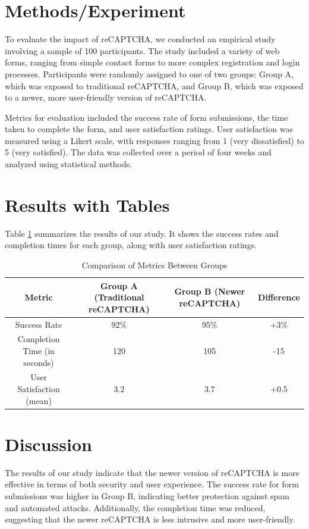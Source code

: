 \documentclass{article}
\begin{document}
\section{Methods/Experiment}
To evaluate the impact of reCAPTCHA, we conducted an empirical study involving a sample of 100 participants. The study included a variety of web forms, ranging from simple contact forms to more complex registration and login processes. Participants were randomly assigned to one of two groups: Group A, which was exposed to traditional reCAPTCHA, and Group B, which was exposed to a newer, more user-friendly version of reCAPTCHA.

Metrics for evaluation included the success rate of form submissions, the time taken to complete the form, and user satisfaction ratings. User satisfaction was measured using a Likert scale, with responses ranging from 1 (very dissatisfied) to 5 (very satisfied). The data was collected over a period of four weeks and analyzed using statistical methods.

\section{Results with Tables}
Table \ref{tab:results} summarizes the results of our study. It shows the success rates and completion times for each group, along with user satisfaction ratings.

\begin{table}[ht]
\centering
\begin{tabular}{|c|c|c|c|}
\hline
\textbf{Metric} & \textbf{Group A (Traditional reCAPTCHA)} & \textbf{Group B (Newer reCAPTCHA)} & \textbf{Difference} \\
\hline
Success Rate & 92\% & 95\% & +3\% \\
Completion Time (in seconds) & 120 & 105 & -15 \\
User Satisfaction (mean) & 3.2 & 3.7 & +0.5 \\
\hline
\end{tabular}
\caption{Comparison of Metrics Between Groups}
\label{tab:results}
\end{table}

\section{Discussion}
The results of our study indicate that the newer version of reCAPTCHA is more effective in terms of both security and user experience. The success rate for form submissions was higher in Group B, indicating better protection against spam and automated attacks. Additionally, the completion time was reduced, suggesting that the newer reCAPTCHA is less intrusive and more user-friendly.
\end{document}
